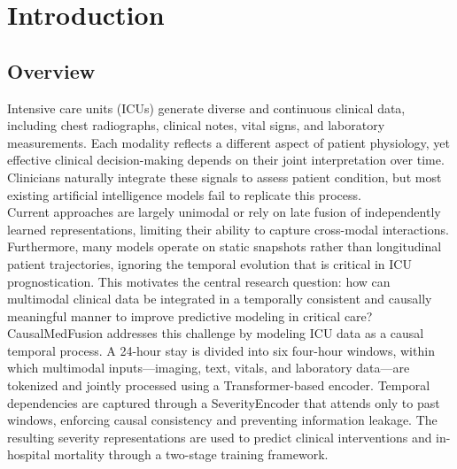 \documentclass{fisatprojectfinal}
\renewcommand{\baselinestretch}{1.25}
\begin{document}
\thispagestyle{empty} %


\listoftables

\thispagestyle{empty}

\newpage

\chapter{Introduction}
\setcounter{page}{1}
\renewcommand{\baselinestretch}{1.50}
\section{Overview}
Intensive care units (ICUs) generate diverse and continuous clinical data, including chest radiographs, clinical notes, vital signs, and laboratory measurements. Each modality reflects a different aspect of patient physiology, yet effective clinical decision-making depends on their joint interpretation over time. Clinicians naturally integrate these signals to assess patient condition, but most existing artificial intelligence models fail to replicate this process. \\

Current approaches are largely unimodal or rely on late fusion of independently learned representations, limiting their ability to capture cross-modal interactions. Furthermore, many models operate on static snapshots rather than longitudinal patient trajectories, ignoring the temporal evolution that is critical in ICU prognostication. This motivates the central research question: how can multimodal clinical data be integrated in a temporally consistent and causally meaningful manner to improve predictive modeling in critical care? \\

CausalMedFusion addresses this challenge by modeling ICU data as a causal temporal process. A 24-hour stay is divided into six four-hour windows, within which multimodal inputs—imaging, text, vitals, and laboratory data—are tokenized and jointly processed using a Transformer-based encoder. Temporal dependencies are captured through a SeverityEncoder that attends only to past windows, enforcing causal consistency and preventing information leakage. The resulting severity representations are used to predict clinical interventions and in-hospital mortality through a two-stage training framework. \\
\end{document}

